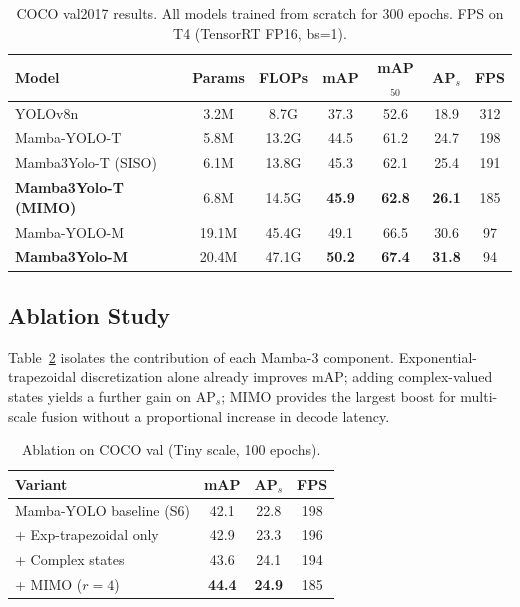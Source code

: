\documentclass[10pt,twocolumn,letterpaper]{article}
\begin{document}
\begin{table}[t]
\centering
\caption{COCO val2017 results. All models trained from scratch for 300 epochs. FPS on T4 (TensorRT FP16, bs=1).}
\label{tab:coco}
\setlength{\tabcolsep}{3.5pt}
\begin{tabular}{lcccccc}
\toprule
Model & Params & FLOPs & mAP & mAP\(_{50}\) & AP\(_s\) & FPS \\
\midrule
YOLOv8n               & 3.2M & 8.7G  & 37.3 & 52.6 & 18.9 & 312 \\
Mamba-YOLO-T          & 5.8M & 13.2G & 44.5 & 61.2 & 24.7 & 198 \\
Mamba3Yolo-T (SISO)   & 6.1M & 13.8G & 45.3 & 62.1 & 25.4 & 191 \\
\textbf{Mamba3Yolo-T (MIMO)} & 6.8M & 14.5G & \textbf{45.9} & \textbf{62.8} & \textbf{26.1} & 185 \\
\midrule
Mamba-YOLO-M          & 19.1M & 45.4G & 49.1 & 66.5 & 30.6 & 97 \\
\textbf{Mamba3Yolo-M} & 20.4M & 47.1G & \textbf{50.2} & \textbf{67.4} & \textbf{31.8} & 94 \\
\bottomrule
\end{tabular}
\end{table}

\subsection{Ablation Study}
Table~\ref{tab:ablation} isolates the contribution of each Mamba-3 component. Exponential-trapezoidal discretization alone already improves mAP; adding complex-valued states yields a further gain on AP\(_s\); MIMO provides the largest boost for multi-scale fusion without a proportional increase in decode latency.

\begin{table}[t]
\centering
\caption{Ablation on COCO val (Tiny scale, 100 epochs).}
\label{tab:ablation}
\begin{tabular}{lccc}
\toprule
Variant & mAP & AP\(_s\) & FPS \\
\midrule
Mamba-YOLO baseline (S6)     & 42.1 & 22.8 & 198 \\
+ Exp-trapezoidal only       & 42.9 & 23.3 & 196 \\
+ Complex states             & 43.6 & 24.1 & 194 \\
+ MIMO (\(r=4\))             & \textbf{44.4} & \textbf{24.9} & 185 \\
\bottomrule
\end{tabular}
\end{table}
\end{document}

